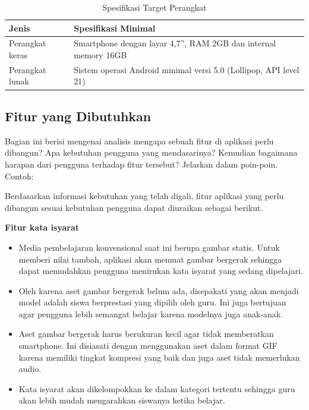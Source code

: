 \documentclass[a4paper,11pt,oneside]{report}
\begin{document}
\begin{table}[H]
    \caption{Spesifikasi Target Perangkat}
    \label{tab:spesifikasi-perangkat}
    \centering
    \begin{tabular}{|p{3.5cm}|p{8cm}|}
        \hline
        \textbf{Jenis} & \textbf{Spesifikasi Minimal} \\ \hline
        Perangkat keras & Smartphone dengan layar 4,7'', RAM 2GB dan internal memory 16GB \\ \hline
        Perangkat lunak & Sistem operasi Android minimal versi 5.0 (Lollipop, API level 21) \\ \hline
    \end{tabular}
\end{table}

\subsection{Fitur yang Dibutuhkan}
Bagian ini berisi mengenai analisis mengapa sebuah fitur di aplikasi perlu
dibangun? Apa kebutuhan pengguna yang mendasarinya? Kemudian bagaimana harapan
dari pengguna terhadap fitur tersebut? Jelaskan dalam poin-poin. Contoh:

Berdasarkan informasi kebutuhan yang telah digali, fitur aplikasi yang perlu
dibangun sesuai kebutuhan pengguna dapat diuraikan sebagai berikut.

\textbf{Fitur kata isyarat}
\begin{itemize}
    \item Media pembelajaran konvensional saat ini berupa gambar statis. Untuk
    memberi nilai tambah, aplikasi akan memuat gambar bergerak sehingga dapat
    memudahkan pengguna menirukan kata isyarat yang sedang dipelajari.
    \item Oleh karena aset gambar bergerak belum ada, disepakati yang akan
    menjadi model adalah siswa berprestasi yang dipilih oleh guru. Ini juga
    bertujuan agar pengguna lebih semangat belajar karena modelnya juga anak-anak.
    \item Aset gambar bergerak harus berukuran kecil agar tidak memberatkan
    smartphone. Ini disiasati dengan menggunakan aset dalam format GIF karena
    memiliki tingkat kompresi yang baik dan juga aset tidak memerlukan audio.
    \item Kata isyarat akan dikelompokkan ke dalam kategori tertentu sehingga
    guru akan lebih mudah mengarahkan siswanya ketika belajar.
\end{itemize}
\end{document}
